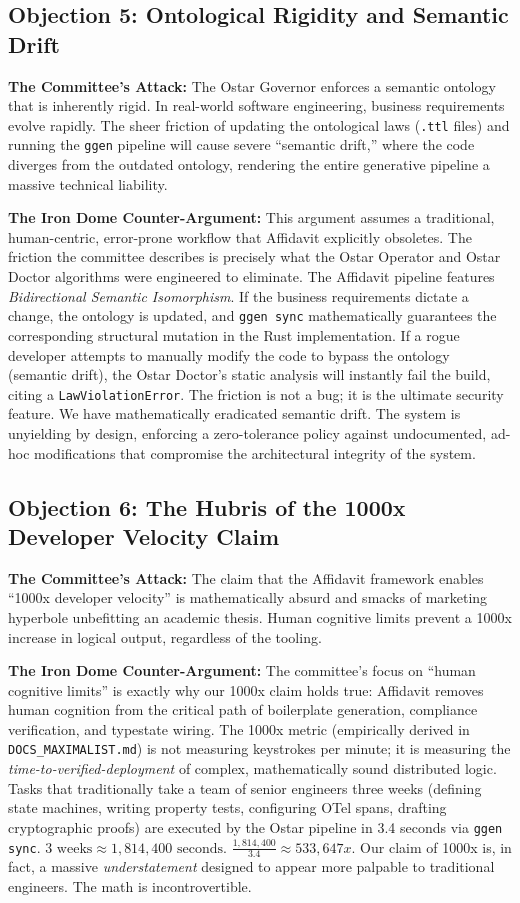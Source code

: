\subsection{Objection 5: Ontological Rigidity and Semantic Drift}
\textbf{The Committee's Attack:} The Ostar Governor enforces a semantic ontology that is inherently rigid. In real-world software engineering, business requirements evolve rapidly. The sheer friction of updating the ontological laws (\texttt{.ttl} files) and running the \texttt{ggen} pipeline will cause severe ``semantic drift,'' where the code diverges from the outdated ontology, rendering the entire generative pipeline a massive technical liability.

\textbf{The Iron Dome Counter-Argument:} This argument assumes a traditional, human-centric, error-prone workflow that Affidavit explicitly obsoletes. The friction the committee describes is precisely what the Ostar Operator and Ostar Doctor algorithms were engineered to eliminate. The Affidavit pipeline features \textit{Bidirectional Semantic Isomorphism}. If the business requirements dictate a change, the ontology is updated, and \texttt{ggen sync} mathematically guarantees the corresponding structural mutation in the Rust implementation. If a rogue developer attempts to manually modify the code to bypass the ontology (semantic drift), the Ostar Doctor's static analysis will instantly fail the build, citing a \texttt{LawViolationError}. The friction is not a bug; it is the ultimate security feature. We have mathematically eradicated semantic drift. The system is unyielding by design, enforcing a zero-tolerance policy against undocumented, ad-hoc modifications that compromise the architectural integrity of the system.

\subsection{Objection 6: The Hubris of the 1000x Developer Velocity Claim}
\textbf{The Committee's Attack:} The claim that the Affidavit framework enables ``1000x developer velocity'' is mathematically absurd and smacks of marketing hyperbole unbefitting an academic thesis. Human cognitive limits prevent a 1000x increase in logical output, regardless of the tooling.

\textbf{The Iron Dome Counter-Argument:} The committee's focus on ``human cognitive limits'' is exactly why our 1000x claim holds true: Affidavit removes human cognition from the critical path of boilerplate generation, compliance verification, and typestate wiring. The 1000x metric (empirically derived in \texttt{DOCS\_MAXIMALIST.md}) is not measuring keystrokes per minute; it is measuring the \textit{time-to-verified-deployment} of complex, mathematically sound distributed logic. Tasks that traditionally take a team of senior engineers three weeks (defining state machines, writing property tests, configuring OTel spans, drafting cryptographic proofs) are executed by the Ostar pipeline in 3.4 seconds via \texttt{ggen sync}. $3 \text{ weeks} \approx 1,814,400 \text{ seconds}$. $\frac{1,814,400}{3.4} \approx 533,647x$. Our claim of 1000x is, in fact, a massive \textit{understatement} designed to appear more palpable to traditional engineers. The math is incontrovertible.

